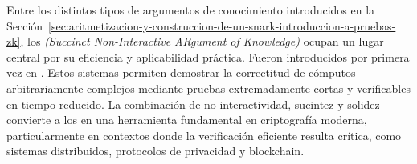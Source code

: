 
Entre los distintos tipos de argumentos de conocimiento introducidos en la Sección~\ref{sec:aritmetizacion-y-construccion-de-un-snark-introduccion-a-pruebas-zk}, los \textit{\SNARK (Succinct Non-Interactive ARgument of Knowledge)} ocupan un lugar central por su eficiencia y aplicabilidad práctica. Fueron introducidos por primera vez en \cite{Bitansky2012}. Estos sistemas permiten demostrar la correctitud de cómputos arbitrariamente complejos mediante pruebas extremadamente cortas y verificables en tiempo reducido. La combinación de no interactividad, sucintez y solidez convierte a los \SNARK en una herramienta fundamental en criptografía moderna, particularmente en contextos donde la verificación eficiente resulta crítica, como sistemas distribuidos, protocolos de privacidad y blockchain.

